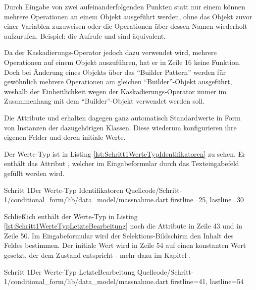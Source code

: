 Durch Eingabe von zwei aufeinanderfolgenden Punkten  statt nur einem  können mehrere Operationen an einem Objekt ausgeführt werden, ohne  das Objekt zuvor einer Variablen zuzuweisen oder die Operationen über dessen Namen wiederholt aufzurufen. Beispiel: die Aufrufe   und  sind äquivalent.

Da der Kaskadierungs-Operator jedoch dazu verwendet wird, mehrere Operationen auf einem Objekt auszuführen, hat er in Zeile 16 keine Funktion.
Doch bei Änderung eines Objekts über das \enquote{Builder Pattern} werden für gewöhnlich mehrere Operationen am gleichen \enquote{Builder}-Objekt ausgeführt, weshalb der Einheitlichkeit wegen der Kaskadierungs-Operator immer im Zusammenhang mit dem \enquote{Builder}-Objekt verwendet werden soll.

Die Attribute  und   erhalten dagegen ganz automatisch Standardwerte in Form von Instanzen der dazugehörigen Klassen.
Diese wiederum konfigurieren ihre eigenen Felder und deren initiale Werte.



Der Werte-Typ  ist in Listing \ref{lst:Schritt1WerteTypIdentifikatoren} zu sehen.
Er enthält das Attribut , welcher im Eingabeformular durch das Texteingabefeld gefüllt werden wird.

\begin{alexlisting}{Schritt 1}{Der Werte-Typ Identifikatoren}
  {Quellcode/Schritt-1/conditional_form/lib/data_model/massnahme.dart}
  {firstline=25, lastline=30}
  \label{lst:Schritt1WerteTypIdentifikatoren}
\end{alexlisting}

Schließlich enthält der Werte-Typ  in Listing \ref{lst:Schritt1WerteTypLetzteBearbeitung} noch die Attribute  in Zeile 43 und  in Zeile 50.
Im Eingabeformular wird der Selektions-Bildschirm den Inhalt des Feldes  bestimmen.
Der initiale Wert wird in Zeile 54 auf einen konstanten Wert gesetzt, der dem Zustand  entspricht - mehr dazu im Kapitel .

\begin{alexlisting}{Schritt 1}{Der Werte-Typ LetzteBearbeitung}
  {Quellcode/Schritt-1/conditional_form/lib/data_model/massnahme.dart}
  {firstline=41, lastline=54}
  \label{lst:Schritt1WerteTypLetzteBearbeitung}
\end{alexlisting}

